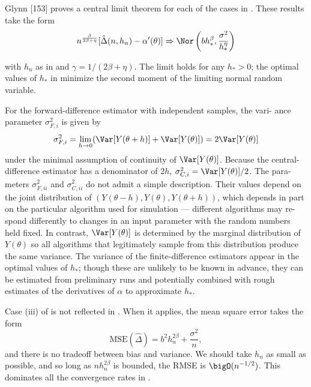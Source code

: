 Glynn [153] proves a central limit theorem for each of the cases in .
These results take the form
\begin{equation} \label{CentralLimitTheoremGlynn}
	n^{\frac{\beta}{2\beta+\eta}} [\hat{\Delta}(n, h_n) - \alpha'(\theta)] \Rightarrow \Nor \left( b h_*^\beta, \frac{\sigma^2}{h_*^\eta} \right)
\end{equation}

with $h_n$ as in  and $\gamma = 1/(2\beta + \eta)$. The limit holds for any $h_* > 0$; the
optimal values of $h_*$ in  minimize the second moment of the limiting
normal random variable.

For the forward-difference estimator with independent samples, the vari-
ance parameter $\sigma_{F,i}^2$ is given by
\begin{equation} \label{VarianceParameterForwardIndependent}
	\sigma_{F,i}^2 = \lim_{h\to 0} (\Var[Y(\theta + h)] + \Var[Y(\theta)]) = 2\Var[Y(\theta)]
\end{equation}
under the minimal assumption of continuity of $\Var[Y(\theta)]$. Because the central-
difference estimator has a denominator of $2h$, $\sigma_{C,i}^2 = \Var[Y(\theta)]/2$. The para-
meters $\sigma_{F,ii}^2$ and $\sigma_{C,ii}^2$ do not admit a simple description. Their values depend
on the joint distribution of $(Y(\theta - h), Y(\theta), Y(\theta + h))$, which depends in part
on the particular algorithm used for simulation --- different algorithms may re-
spond differently to changes in an input parameter with the random numbers
held fixed. In contrast, $\Var[Y(\theta)]$ is determined by the marginal distribution of
$Y(\theta)$ so all algorithms that legitimately sample from this distribution produce
the same variance. The variance of the finite-difference estimators appear in
the optimal values of $h_*$; though these are unlikely to be known in advance,
they can be estimated from preliminary runs and potentially combined with
rough estimates of the derivatives of $\alpha$ to approximate $h_*$.

Case (iii) of  is not reflected in . When it applies, the mean
square error takes the form
\begin{equation} \label{MeanSquareErrorCaseThree}
	\mathrm{MSE}(\hat{\Delta}) = b^2 h_n^{2\beta} + \frac{\sigma^2}{n} ,
\end{equation}
and there is no tradeoff between bias and variance. We should take $h_n$ as
small as possible, and so long as $nh_n^{2\beta}$ is bounded, the RMSE is $\bigO(n^{-1/2})$.
This dominates all the convergence rates in .

